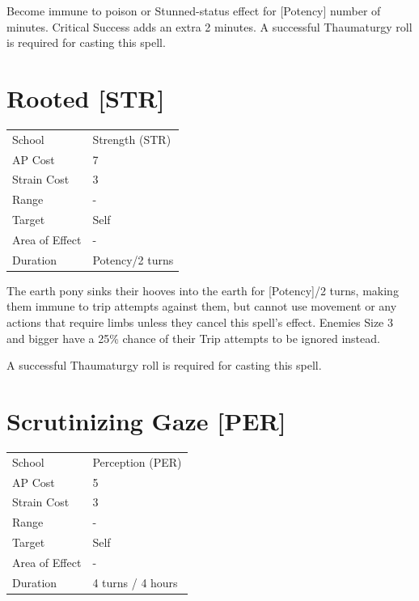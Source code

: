 \documentclass[11pt,a4paper,twocolumn]{book}
\begin{document}
\medskip

Become immune to poison or Stunned-status effect for [Potency] number of minutes. Critical Success adds an extra 2 minutes. A successful Thaumaturgy roll is required for casting this spell.


\section*{Rooted [STR]}
{
	\begin{tabu} to 75mm{| X[l,4] | X[l,7] |}
		\hline
		School 			& Strength (STR) 	\\
        AP Cost	      	& 7 				\\
        Strain Cost     & 3 				\\
        Range     		& - 				\\
        Target      	& Self 				\\
        Area of Effect  & - 	 			\\
        Duration     	& Potency/2 turns 	\\ \hline
	\end{tabu}
		
}

\medskip

The earth pony sinks their hooves into the earth for [Potency]/2 turns, making them immune to trip attempts against them, but cannot use movement or any actions that require limbs unless they cancel this spell's effect. Enemies Size 3 and bigger have a 25\% chance of their Trip attempts to be ignored instead.

A successful Thaumaturgy roll is required for casting this spell.

\vfill


\section*{Scrutinizing Gaze [PER]}
{
	\begin{tabu} to 75mm{| X[l,4] | X[l,7] |}
		\hline
		School 			& Perception (PER) 	\\
		AP Cost	      	& 5 				\\
		Strain Cost     & 3 				\\
		Range     		& - 	\\
		Target      	& Self				\\
		Area of Effect  & - 	 		\\
		Duration     	& 4 turns / 4 hours 				\\ \hline
	\end{tabu}
	
}
\end{document}
